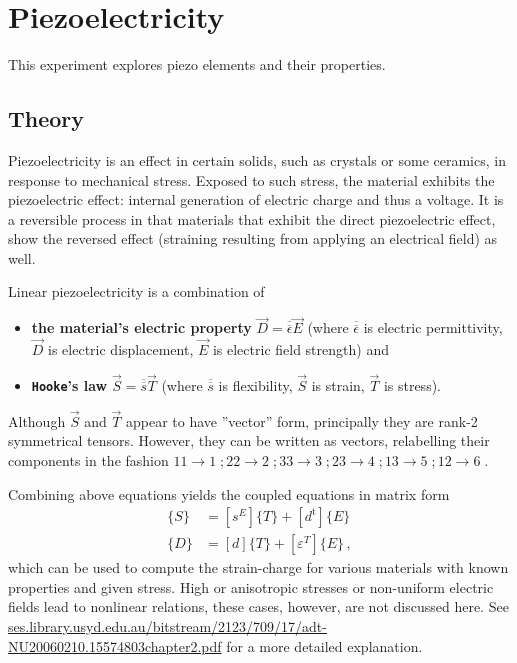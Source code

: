 \chapter{Piezoelectricity}
This experiment explores piezo elements and their properties.

\section{Theory}
Piezoelectricity is an effect in certain solids, such as crystals or some ceramics, in response to mechanical stress.
Exposed to such stress, the material exhibits the piezoelectric effect: internal generation of electric charge and thus a voltage.
It is a reversible process in that materials that exhibit the direct piezoelectric effect, show the reversed effect (straining resulting from applying an electrical field) as well.

Linear piezoelectricity is a combination of
\begin{itemize}
	\item \textbf{the material's electric property} $\vec{D}=\overline{\overline{\epsilon}}\vec{E}$ (where $\overline{\overline{\epsilon}}$ is electric permittivity, $\vec{D}$ is electric displacement, $\vec{E}$ is electric field strength) and
	\item \textbf{\texttt{Hooke}'s law} $\vec{S}=\overline{\overline{s}}\vec{T}$ (where $\overline{\overline{s}}$ is flexibility, $\vec{S}$ is strain, $\vec{T}$ is stress).
\end{itemize}
Although $\vec{S}$ and $\vec{T}$ appear to have ''vector'' form, principally they are rank-2 symmetrical tensors.
However, they can be written as vectors, relabelling their components in the fashion $11 \rightarrow 1 \;;  22 \rightarrow 2 \;;  33 \rightarrow 3 \;;  23 \rightarrow 4 \;;  13 \rightarrow 5 \; ;  12 \rightarrow 6 \;$.

Combining above equations yields the coupled equations in matrix form\cite{IEEEPiezo}
\begin{align*}
	\{S\} &= \left [s^E \right ]\{T\}+[d^\mathrm{t}]\{E\} \\
	\{D\} &= [d]\{T\}+\left [ \varepsilon^T \right ] \{E\} \,,
\end{align*}
which can be used to compute the strain-charge for various materials with known properties and given stress.
High or anisotropic stresses or non-uniform electric fields lead to nonlinear relations, these cases, however, are not discussed here.
See \url{ses.library.usyd.edu.au/bitstream/2123/709/17/adt-NU20060210.15574803chapter2.pdf} for a more detailed explanation.
\clearpage
